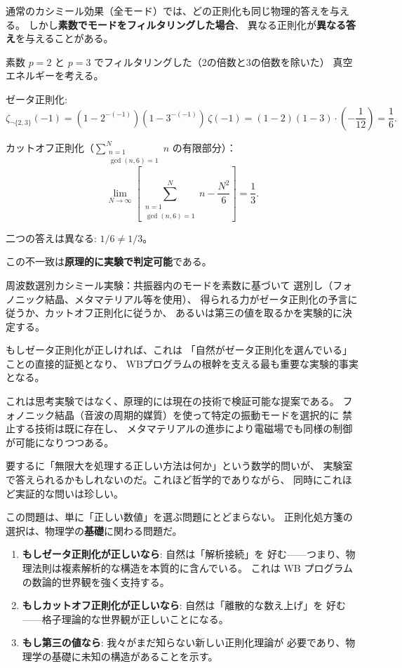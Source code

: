 通常のカシミール効果（全モード）では、どの正則化も同じ物理的答えを与える。
しかし\textbf{素数でモードをフィルタリングした場合}、
異なる正則化が\textbf{異なる答え}を与えることがある。

\begin{keybox}[レギュレーター予想]
素数 $p=2$ と $p=3$ でフィルタリングした（2の倍数と3の倍数を除いた）
真空エネルギーを考える。

ゼータ正則化:
\[
  \zeta_{\neg\{2,3\}}(-1)
  = (1-2^{-(-1)})(1-3^{-(-1)})\,\zeta(-1)
  = (1-2)(1-3)\cdot\left(-\frac{1}{12}\right)
  = \frac{1}{6}.
\]

カットオフ正則化（$\sum_{\substack{n=1 \\ \gcd(n,6)=1}}^{N} n$ の有限部分）：
\[
  \lim_{N\to\infty}\left[\sum_{\substack{n=1 \\ \gcd(n,6)=1}}^{N} n
  - \frac{N^2}{6}\right]
  = \frac{1}{3}.
\]

二つの答えは異なる: $1/6 \neq 1/3$。
\end{keybox}

この不一致は\textbf{原理的に実験で判定可能}である。

\begin{hypbox}
周波数選別カシミール実験：共振器内のモードを素数に基づいて
選別し（フォノニック結晶、メタマテリアル等を使用）、
得られる力がゼータ正則化の予言に従うか、カットオフ正則化に従うか、
あるいは第三の値を取るかを実験的に決定する。

もしゼータ正則化が正しければ、これは
「自然がゼータ正則化を選んでいる」ことの直接的証拠となり、
WBプログラムの根幹を支える最も重要な実験的事実となる。
\end{hypbox}

\begin{hsbox}
これは思考実験ではなく、原理的には現在の技術で検証可能な提案である。
フォノニック結晶（音波の周期的媒質）を使って特定の振動モードを選択的に
禁止する技術は既に存在し、
メタマテリアルの進歩により電磁場でも同様の制御が可能になりつつある。

要するに「無限大を処理する正しい方法は何か」という数学的問いが、
実験室で答えられるかもしれないのだ。これほど哲学的でありながら、
同時にこれほど実証的な問いは珍しい。
\end{hsbox}

この問題は、単に「正しい数値」を選ぶ問題にとどまらない。
正則化処方箋の選択は、物理学の\textbf{基礎}に関わる問題だ。

\begin{enumerate}
  \item \textbf{もしゼータ正則化が正しいなら}: 自然は「解析接続」を
        好む——つまり、物理法則は複素解析的な構造を本質的に含んでいる。
        これは WB プログラムの数論的世界観を強く支持する。
  \item \textbf{もしカットオフ正則化が正しいなら}: 自然は「離散的な数え上げ」を
        好む——格子理論的な世界観が正しいことになる。
  \item \textbf{もし第三の値なら}: 我々がまだ知らない新しい正則化理論が
        必要であり、物理学の基礎に未知の構造があることを示す。
\end{enumerate}

